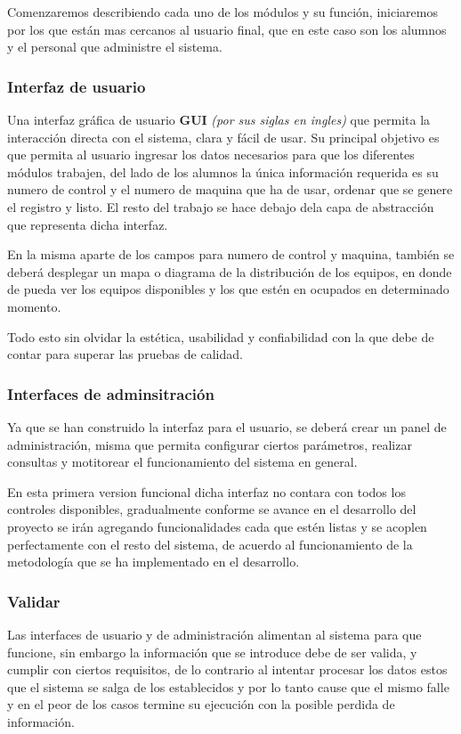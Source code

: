 \documentclass[12pt]{article} %
\begin{document}
		Comenzaremos describiendo cada uno de los módulos y su función, iniciaremos por los que están mas cercanos al usuario final, que en este caso son los alumnos y el 
		personal que administre el sistema.
		
		\subsubsection{Interfaz de usuario \label{GUI}}
		
			Una interfaz gráfica de usuario \textbf{GUI} \textit{(por sus siglas en ingles)} que permita la interacción directa con el sistema, 
			clara y fácil de usar.
			Su principal objetivo es que permita al usuario ingresar los datos necesarios para que los diferentes módulos trabajen, del lado de los alumnos la única 
			información requerida es su numero de control y el numero de maquina que ha de usar, ordenar que se genere el registro y listo.
			El resto del trabajo se hace debajo dela capa de abstracción que representa dicha interfaz.
			
			En la misma aparte de los campos para numero de control y maquina, también se deberá desplegar un mapa o diagrama de la distribución de los equipos, en donde 
			de pueda ver los equipos disponibles y los que estén en ocupados en determinado momento.
			
			Todo esto sin olvidar la estética, usabilidad y confiabilidad con la que debe de contar para superar las pruebas de calidad.

		\subsubsection{Interfaces de adminsitraci\'on \label{administracio}}
			
			Ya que se han construido la interfaz para el usuario, se deberá crear un panel de administración, misma que permita configurar ciertos parámetros, realizar
			consultas y motitorear el funcionamiento del sistema en general.
			
			En esta primera version funcional dicha interfaz no contara con todos los controles disponibles, gradualmente conforme se avance en el desarrollo del proyecto
			se irán agregando funcionalidades cada que estén listas y se acoplen perfectamente con el resto del sistema, de acuerdo al funcionamiento de la metodología que
			se ha implementado en el desarrollo.
		
		\subsubsection{Validar \label{validar}} 
			Las interfaces de usuario y de administración alimentan al sistema para que funcione, sin embargo la información que se introduce debe de ser valida, y cumplir 
			con ciertos requisitos, de lo contrario al intentar procesar los datos estos  que el sistema se salga de los  establecidos y por lo tanto 
			cause que el mismo falle y en el peor de los casos termine su ejecución con la posible perdida de información.
			
\end{document}
